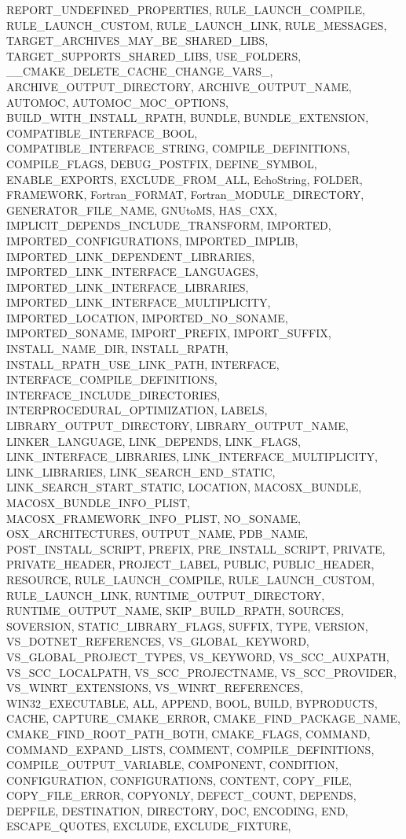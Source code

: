 {{      REPORT_UNDEFINED_PROPERTIES, RULE_LAUNCH_COMPILE, RULE_LAUNCH_CUSTOM,
      RULE_LAUNCH_LINK, RULE_MESSAGES, TARGET_ARCHIVES_MAY_BE_SHARED_LIBS,
      TARGET_SUPPORTS_SHARED_LIBS, USE_FOLDERS,
      __CMAKE_DELETE_CACHE_CHANGE_VARS_, ARCHIVE_OUTPUT_DIRECTORY,
      ARCHIVE_OUTPUT_NAME, AUTOMOC, AUTOMOC_MOC_OPTIONS,
      BUILD_WITH_INSTALL_RPATH, BUNDLE, BUNDLE_EXTENSION,
      COMPATIBLE_INTERFACE_BOOL, COMPATIBLE_INTERFACE_STRING,
      COMPILE_DEFINITIONS, COMPILE_FLAGS, DEBUG_POSTFIX, DEFINE_SYMBOL,
      ENABLE_EXPORTS, EXCLUDE_FROM_ALL, EchoString, FOLDER, FRAMEWORK,
      Fortran_FORMAT, Fortran_MODULE_DIRECTORY, GENERATOR_FILE_NAME,
      GNUtoMS, HAS_CXX, IMPLICIT_DEPENDS_INCLUDE_TRANSFORM, IMPORTED,
      IMPORTED_CONFIGURATIONS, IMPORTED_IMPLIB,
      IMPORTED_LINK_DEPENDENT_LIBRARIES, IMPORTED_LINK_INTERFACE_LANGUAGES,
      IMPORTED_LINK_INTERFACE_LIBRARIES,
      IMPORTED_LINK_INTERFACE_MULTIPLICITY, IMPORTED_LOCATION,
      IMPORTED_NO_SONAME, IMPORTED_SONAME, IMPORT_PREFIX, IMPORT_SUFFIX,
      INSTALL_NAME_DIR, INSTALL_RPATH, INSTALL_RPATH_USE_LINK_PATH,
      INTERFACE, INTERFACE_COMPILE_DEFINITIONS,
      INTERFACE_INCLUDE_DIRECTORIES, INTERPROCEDURAL_OPTIMIZATION, LABELS,
      LIBRARY_OUTPUT_DIRECTORY, LIBRARY_OUTPUT_NAME, LINKER_LANGUAGE,
      LINK_DEPENDS, LINK_FLAGS, LINK_INTERFACE_LIBRARIES,
      LINK_INTERFACE_MULTIPLICITY, LINK_LIBRARIES, LINK_SEARCH_END_STATIC,
      LINK_SEARCH_START_STATIC, LOCATION, MACOSX_BUNDLE,
      MACOSX_BUNDLE_INFO_PLIST, MACOSX_FRAMEWORK_INFO_PLIST, NO_SONAME,
      OSX_ARCHITECTURES, OUTPUT_NAME, PDB_NAME, POST_INSTALL_SCRIPT,
      PREFIX, PRE_INSTALL_SCRIPT, PRIVATE, PRIVATE_HEADER, PROJECT_LABEL,
      PUBLIC, PUBLIC_HEADER, RESOURCE, RULE_LAUNCH_COMPILE,
      RULE_LAUNCH_CUSTOM, RULE_LAUNCH_LINK, RUNTIME_OUTPUT_DIRECTORY,
      RUNTIME_OUTPUT_NAME, SKIP_BUILD_RPATH, SOURCES, SOVERSION,
      STATIC_LIBRARY_FLAGS, SUFFIX, TYPE, VERSION, VS_DOTNET_REFERENCES,
      VS_GLOBAL_KEYWORD, VS_GLOBAL_PROJECT_TYPES, VS_KEYWORD,
      VS_SCC_AUXPATH, VS_SCC_LOCALPATH, VS_SCC_PROJECTNAME,
      VS_SCC_PROVIDER, VS_WINRT_EXTENSIONS, VS_WINRT_REFERENCES,
      WIN32_EXECUTABLE, ALL, APPEND, BOOL, BUILD, BYPRODUCTS, CACHE,
      CAPTURE_CMAKE_ERROR, CMAKE_FIND_PACKAGE_NAME,
      CMAKE_FIND_ROOT_PATH_BOTH, CMAKE_FLAGS, COMMAND,
      COMMAND_EXPAND_LISTS, COMMENT, COMPILE_DEFINITIONS,
      COMPILE_OUTPUT_VARIABLE, COMPONENT, CONDITION, CONFIGURATION,
      CONFIGURATIONS, CONTENT, COPY_FILE, COPY_FILE_ERROR, COPYONLY,
      DEFECT_COUNT, DEPENDS, DEPFILE, DESTINATION, DIRECTORY, DOC,
      ENCODING, END, ESCAPE_QUOTES, EXCLUDE, EXCLUDE_FIXTURE,
}}
